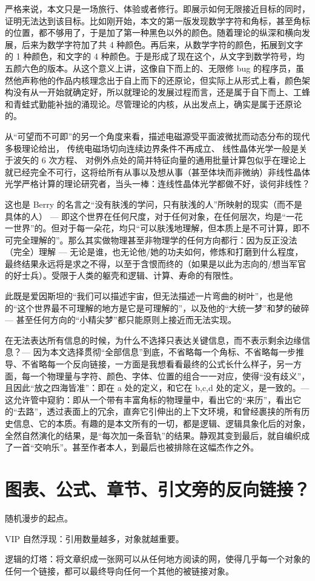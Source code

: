 严格来说，本文只是一场旅行、体验或者修行。即展示如何无限接近目标的同时，证明无法达到该目标。比如刚开始，本文的第一版发现数学字符和角标，甚至角标的位置，都不够用了，于是加了第一种黑色以外的颜色。随着理论的纵深和横向发展，后来为数学字符加了共 4 种颜色。再后来，从数学字符的颜色，拓展到文字的 1 种颜色，和文字的 4 种颜色。于是形成了现在这个，从文字到数学符号，均五颜六色的版本。从这个意义上讲，这像自下而上的、无限修 bug 的程序员，虽然他声称他的作品内核理念出于自上而下的还原论，但实际上从形式上看，颜色架构没有从一开始就确定好，所以就理论的发展过程而言，还是属于自下而上、工蜂和青蛙式勤能补拙的涌现论。尽管理论的内核，从出发点上，确实是属于还原论的。

从“可望而不可即”的另一个角度来看，描述电磁源受平面波微扰而动态分布的现代多极理论给出，{\one} 传统电磁场切向连续边界条件不再成立、{\two} 线性晶体光学一般是关于波矢的 6 次方程、{\three} 对例外点处的简并特征向量的通用批量计算包似乎在理论上就已经完全不可行，这将给所有从事以及想从事（甚至体块而非微纳）非线性晶体光学严格计算的理论研究者，当头一棒：连线性晶体光学都做不好，谈何非线性？

这也是 Berry 的名言之“没有肤浅的学问，只有肤浅的人”所映射的现实（而不是具体的人） --- 即这个世界在任何尺度，对于任何对象，在任何层次，均是“一花一世界”的。但对于每一朵花，均只“可以肤浅地理解，但本质上是不可计算，即不可完全理解的”。那么其实做物理甚至非物理学的任何方向都行：因为反正没法（完全）理解 --- 无论是谁，也无论他/她的功夫如何，修炼和打磨到什么程度，最终结果永远将是求之不得，以至于含恨而终的（如果是以此为志向的/想当军官的好士兵）。受限于人类的躯壳和逻辑、计算、寿命的有限性。

此既是爱因斯坦的“我们可以描述宇宙，但无法描述一片弯曲的树叶”，也是他的“这个世界最不可理解的地方是它是可理解的”，以及他的“大统一梦”和梦的破碎 --- 甚至任何方向的“小精尖梦”都只能原则上接近而无法实现。

在无法表达所有信息的时候，为什么不选择只表达关键信息，而不表示剩余边缘信息？--- 因为本文选择贯彻“全部信息”到底，不省略每一个角标、不省略每一步推导、不省略每一个反向链接，一方面是我想看看最终的公式长什么样子，另一方面，每一个物理量与字符、颜色、字体、位置的组合一一对应，使得“没有歧义”，且因此“放之四海皆准”：即在 a 处的定义，和它在 b,c,d 处的定义，是一致的。--- 这允许管中窥豹：即从一个带有丰富角标的物理量中，看出它的“来历”，看出它的“去路”，透过表面上的冗余，直奔它引伸出的上下文环境，和曾经裹挟的所有历史信息、它的本质。有趣的是本文所有的一切，都是逻辑、逻辑具象化后的对象，全然自然演化的结果，是“每次加一条音轨”的结果。静观其变到最后，就自编织成了一首“交响乐”。甚至作者本人，到最后也被排除在这幅杰作之外。

\section{图表、公式、章节、引文旁的反向链接？}\label{sec:t}

{\one} 随机漫步的起点。

{\two} VIP 自然浮现：引用数量越多，对象就越重要。

{\three} 逻辑的灯塔：将文章织成一张网可以从任何地方阅读的网，使得几乎每一个对象的任何一个链接，都可以最终导向任何一个其他的被链接对象。
